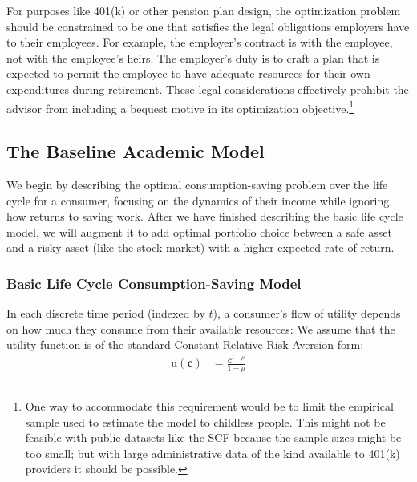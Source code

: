 \documentclass{article}
\newcommand{\CRRA}{\rho}
\newcommand{\uFunc}{\mathrm{u}}
\newcommand{\cLvl}{\mathbf{c}}
\begin{document}
For purposes like 401(k) or other pension plan design, the optimization problem should be constrained to be one that satisfies the legal obligations employers have to their employees.
For example, the employer's contract is with the employee, not with the employee's heirs.
The employer's duty is to craft a plan that is expected to permit the employee to have adequate resources for their own expenditures during retirement.
These legal considerations effectively prohibit the advisor from including a bequest motive in its optimization objective.\footnote{One way to accommodate this requirement would be to limit the empirical sample used to estimate the model to childless people.
This might not be feasible with public datasets like the SCF because the sample sizes might be too small; but with large administrative data of the kind available to 401(k) providers it should be possible.}

\subsection{The Baseline Academic Model}

We begin by describing the optimal consumption-saving problem over the life cycle for a consumer, focusing on the dynamics of their income while ignoring how returns to saving work.
After we have finished describing the basic life cycle model, we will augment it to add optimal portfolio choice between a safe asset and a risky asset (like the stock market) with a higher expected rate of return.

\subsubsection{Basic Life Cycle Consumption-Saving Model}

In each discrete time period (indexed by $t$), a consumer's flow of utility depends on how much they consume from their available resources:
We assume that the utility function is of the standard Constant Relative Risk Aversion form:
\begin{align}
    \uFunc(\cLvl) & = \frac{\cLvl^{1-\CRRA}}{1-\CRRA}
\end{align}
\end{document}
